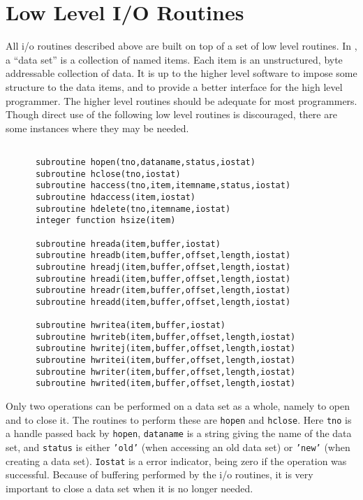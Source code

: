 \section{Low Level I/O Routines}
All i/o routines described above are built on top of a set of
low level routines. In \miriad, a ``data set'' is a collection of 
named items. Each item is an unstructured, byte addressable collection of data.
It is up
to the higher level software to impose some structure to the data items, and
to provide a better interface for the high level programmer.
The higher level routines should be adequate for most
programmers. Though direct use of the following low level routines is
discouraged, there are some instances where they may be needed.
\begin{verbatim}

      subroutine hopen(tno,dataname,status,iostat)
      subroutine hclose(tno,iostat)
      subroutine haccess(tno,item,itemname,status,iostat)
      subroutine hdaccess(item,iostat)
      subroutine hdelete(tno,itemname,iostat)
      integer function hsize(item)

      subroutine hreada(item,buffer,iostat)
      subroutine hreadb(item,buffer,offset,length,iostat)
      subroutine hreadj(item,buffer,offset,length,iostat)
      subroutine hreadi(item,buffer,offset,length,iostat)
      subroutine hreadr(item,buffer,offset,length,iostat)
      subroutine hreadd(item,buffer,offset,length,iostat)

      subroutine hwritea(item,buffer,iostat)
      subroutine hwriteb(item,buffer,offset,length,iostat)
      subroutine hwritej(item,buffer,offset,length,iostat)
      subroutine hwritei(item,buffer,offset,length,iostat)
      subroutine hwriter(item,buffer,offset,length,iostat)
      subroutine hwrited(item,buffer,offset,length,iostat)

\end{verbatim}
Only two operations can be performed on a data set as a whole, namely to
open and to close it. The routines to perform these are
{\tt hopen} and {\tt hclose}. Here {\tt tno} is a handle passed back
by {\tt hopen}, {\tt dataname} is a string giving the name of the data set,
and {\tt status} is either {\tt 'old'} (when accessing an old data set)
or {\tt 'new'} (when creating a data set). {\tt Iostat} is a error
indicator, being zero if the operation was successful. Because of
buffering performed by the i/o routines, it is very 
important to close a data set when it is no longer needed.

